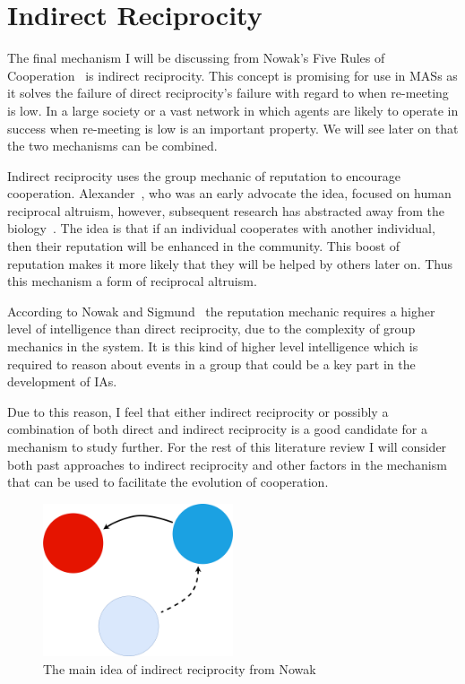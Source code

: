 \documentclass[]{final_report}
\begin{document}
\section{Indirect Reciprocity}
The final mechanism I will be discussing from Nowak's Five Rules of Cooperation~\cite{five_rules_coop} is indirect reciprocity. This concept is promising for use in MASs as it solves the failure of direct reciprocity's failure with regard to when re-meeting is low. In a large society or a vast network in which agents are likely to operate in success when re-meeting is low is an important property. We will see later on that the two mechanisms can be combined.\par
Indirect reciprocity uses the group mechanic of reputation to encourage cooperation. Alexander~\cite{alexander1987biology}, who was an early advocate the idea, focused on human reciprocal altruism, however, subsequent research has abstracted away from the biology~\cite{phelps_game_theoretic_analysis, imagevsstanding, evol_indirect_image, evoldirindir, five_rules_coop, leimarhammer, sugden2004economics, gossip_alt, mui2002computational}. The idea is that if an individual cooperates with another individual, then their reputation will be enhanced in the community. This boost of reputation makes it more likely that they will be helped by others later on. Thus this mechanism a form of reciprocal altruism.\par
According to Nowak and Sigmund~\cite{evol_indirect_image} the reputation mechanic requires a higher level of intelligence than direct reciprocity, due to the complexity of group mechanics in the system. It is this kind of higher level intelligence which is required to reason about events in a group that could be a key part in the development of IAs.\par
Due to this reason, I feel that either indirect reciprocity or possibly a combination of both direct and indirect reciprocity is a good candidate for a mechanism to study further. For the rest of this literature review I will consider both past approaches to indirect reciprocity and other factors in the mechanism that can be used to facilitate the evolution of cooperation.
\begin{figure}
	\center
	\includegraphics[width=0.5\textwidth]{IndirectRec.png}
	\caption{The main idea of indirect reciprocity from Nowak~\cite{five_rules_coop}}
	\label{fig:indir_rec}
\end{figure}
\end{document}
